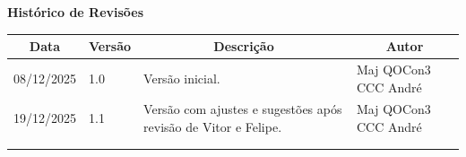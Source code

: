 \begin{table}[h]
	\begin{center}
	    \textbf{\Huge{Histórico de Revisões}}
	\end{center}
    \centering
	\begin{tabular}{|p{3cm}|p{1.5cm}|p{7.5cm}|p{3.2cm}|}
		\hline \multicolumn{1}{|c|}{\textbf{Data}} & \multicolumn{1}{|c|}{\textbf{Versão}} &
			\multicolumn{1}{|c|}{\textbf{Descrição}} & \multicolumn{1}{|c|}{\textbf{Autor}} \\ \hline
		08/12/2025 & 1.0 & Versão inicial. & Maj QOCon3 CCC André \\ \hline
		19/12/2025 & 1.1 & Versão com ajustes e sugestões após revisão de Vitor e Felipe. & Maj QOCon3 CCC André \\ \hline
		& & & \\ \hline
		& & & \\ \hline
	\end{tabular}
\end{table}